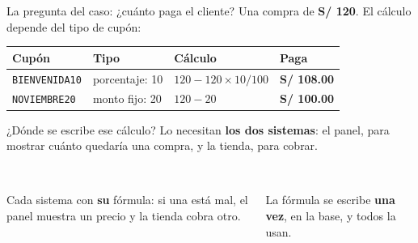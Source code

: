 \documentclass[aspectratio=169,10pt,c]{beamer}
\newcommand{\mal}[1]{{\setlength{\fboxsep}{1.2pt}\colorbox{utpRojo!18}{#1}}}
\begin{document}
\begin{frame}{La pregunta del caso: ¿cuánto paga el cliente?}
\small Una compra de \textbf{S/ 120}. El cálculo depende del tipo de cupón:
\vspace{0.15cm}
\begin{center}
\small
\renewcommand{\arraystretch}{1.3}
\begin{tabular}{@{}llll@{}}
\toprule
\bfseries Cupón & \bfseries Tipo & \bfseries Cálculo & \bfseries Paga \\
\midrule
\texttt{BIENVENIDA10} & porcentaje: 10 & $120 - 120 \times 10 / 100$ & \textbf{S/ 108.00} \\
\texttt{NOVIEMBRE20} & monto fijo: 20 & $120 - 20$ & \textbf{S/ 100.00} \\
\bottomrule
\end{tabular}
\end{center}
\vspace{0.1cm}
\small ¿Dónde se escribe ese cálculo? Lo necesitan \textbf{los dos sistemas}: el panel, para mostrar cuánto quedaría una compra, y la tienda, para cobrar.
\vspace{0.15cm}
\begin{columns}[c,onlytextwidth]
\centering
{}\\[4pt]
\footnotesize Cada sistema con \textbf{su} fórmula: si una está mal, el panel muestra un precio y la tienda cobra otro.
\centering
{}\\[4pt]
\footnotesize La fórmula se escribe \textbf{una vez}, en la base, y todos la usan.
\end{columns}
\end{frame}
\end{document}
